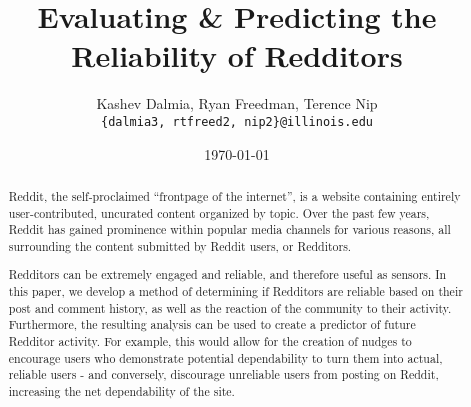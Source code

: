 \documentclass[a4paper]{article}
\title{Evaluating \& Predicting the Reliability of Redditors}
\author{Kashev Dalmia, Ryan Freedman, Terence Nip \\
        \texttt{\{dalmia3, rtfreed2, nip2\}@illinois.edu}
       }
\date{\today}
\begin{document}
\maketitle


\begin{abstract}
Reddit, the self-proclaimed ``frontpage of the internet'', is a website
containing entirely user-contributed, uncurated content organized by topic. Over
the past few years, Reddit has gained prominence within popular media channels
for various reasons, all surrounding the content submitted by Reddit users, or
Redditors.
\newline

Redditors can be extremely engaged and reliable, and therefore useful as
sensors. In this paper, we develop a method of determining if Redditors are
reliable based on their post and comment history, as well as the reaction of the
community to their activity. Furthermore, the resulting analysis can be used to
create a predictor of future Redditor activity. For example, this would allow
for the creation of nudges to encourage users who demonstrate potential
dependability to turn them into actual, reliable users - and conversely,
discourage unreliable users from posting on Reddit, increasing the net
dependability of the site.

\end{abstract}
\end{document}
